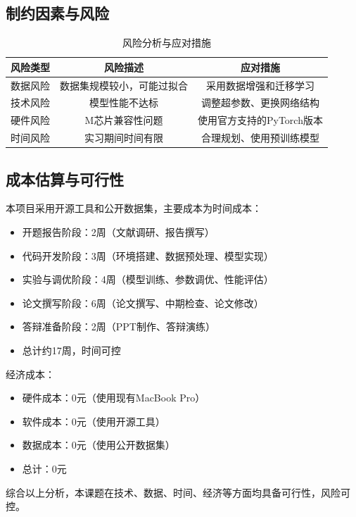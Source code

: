\documentclass[supercite]{Hust-undergraduate-kaiti}
\theoremstyle{definition}
\begin{document}
\subsection{制约因素与风险}

\begin{table}[htb]
\centering
\caption{风险分析与应对措施}
\begin{tabular}{|c|c|c|}
\hline
\textbf{风险类型} & \textbf{风险描述} & \textbf{应对措施} \\ \hline
数据风险 & 数据集规模较小，可能过拟合 & 采用数据增强和迁移学习 \\ \hline
技术风险 & 模型性能不达标 & 调整超参数、更换网络结构 \\ \hline
硬件风险 & M芯片兼容性问题 & 使用官方支持的PyTorch版本 \\ \hline
时间风险 & 实习期间时间有限 & 合理规划、使用预训练模型 \\ \hline
\end{tabular}
\end{table}

\subsection{成本估算与可行性}

本项目采用开源工具和公开数据集，主要成本为时间成本：
\begin{itemize}
    \item 开题报告阶段：2周（文献调研、报告撰写）
    \item 代码开发阶段：3周（环境搭建、数据预处理、模型实现）
    \item 实验与调优阶段：4周（模型训练、参数调优、性能评估）
    \item 论文撰写阶段：6周（论文撰写、中期检查、论文修改）
    \item 答辩准备阶段：2周（PPT制作、答辩演练）
    \item 总计约17周，时间可控
\end{itemize}

经济成本：
\begin{itemize}
    \item 硬件成本：0元（使用现有MacBook Pro）
    \item 软件成本：0元（使用开源工具）
    \item 数据成本：0元（使用公开数据集）
    \item 总计：0元
\end{itemize}

综合以上分析，本课题在技术、数据、时间、经济等方面均具备可行性，风险可控。
\end{document}
